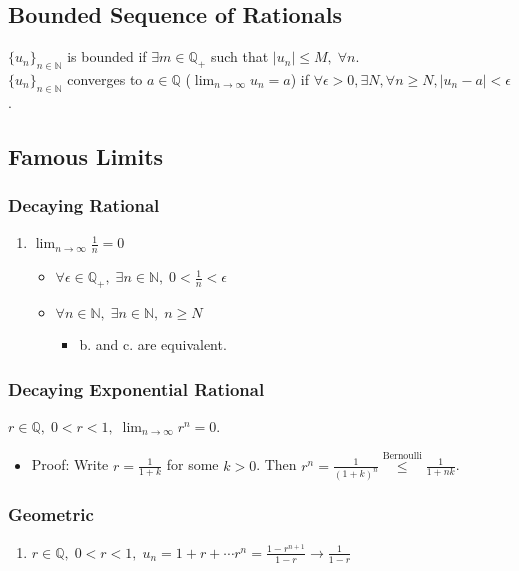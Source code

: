\documentclass[11pt]{article}
\newcommand{\0}{\emptyset}
\newcommand{\N}{\mathbb{N}}
\newcommand{\Q}{\mathbb{Q}}
\begin{document}
\subsection*{Bounded Sequence of Rationals}
\label{sec:orgcb12e36}
\(\{u_{n}\}_{n\in\N}\) is bounded if \(\exists m\in\Q_{+}\) such that \(|u_{n}|\leq M,\;\forall n\).\\[0pt]
\(\{u_{n}\}_{n\in\N}\) converges to \(a\in\Q\) (\(\lim_{n\to\infty}u_{n}=a\)) if \(\forall\epsilon>0,\exists N,\forall n\geq N,|u_{n}-a|<\epsilon\).\\[0pt]
\subsection*{Famous Limits}
\label{sec:org10143e0}
\subsubsection*{Decaying Rational}
\label{sec:org7c5f1e8}
\begin{enumerate}
\item \(\lim_{n\to\infty}\frac{1}{n} = 0\)\\[0pt]
\begin{itemize}
\item \(\forall\epsilon\in\Q_{+},\;\exists n\in\N,\;0<\frac{1}{n}<\epsilon\)\\[0pt]
\item \(\forall n\in\N,\;\exists n\in\N,\;n\geq N\)\\[0pt]
\begin{itemize}
\item b. and c. are equivalent.\\[0pt]
\end{itemize}
\end{itemize}
\end{enumerate}
\subsubsection*{Decaying Exponential Rational}
\label{sec:org4ac4c69}
\(r\in\Q,\;0<r<1,\;\lim_{n\to\infty}r^{n}=0\).\\[0pt]
\begin{itemize}
\item Proof:
\label{sec:org6c45357}
Write \(r=\frac{1}{1+k}\) for some \(k>0\). Then \(r^{n}=\frac{1}{(1+k)^{n}} \overset{\text{Bernoulli}}{\leq} \frac{1}{1+nk}\).\\[0pt]
\end{itemize}
\subsubsection*{Geometric}
\label{sec:orgc93b4fa}
\begin{enumerate}
\item \(r\in\Q,\;0<r<1,\;u_{n}=1+r+\cdots r^{n}=\frac{1-r^{n+1}}{1-r} \to \frac{1}{1-r}\)\\[0pt]
\end{enumerate}
\end{document}
